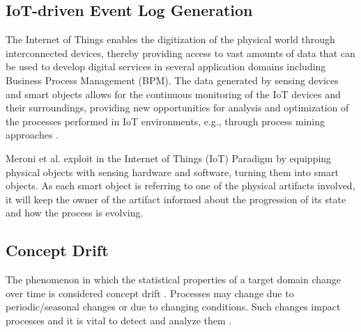 
\begin{multicols}{2}

\subsection{IoT-driven Event Log Generation}
The Internet of Things enables the digitization of the physical world through interconnected devices, thereby providing access to vast amounts of data that can be used to develop digital services in several application domains including Business Process Management (BPM). The data generated by sensing devices and smart objects allows for the continuous monitoring of the IoT devices and their surroundings, providing new opportunities for analysis and optimization of the processes performed in IoT environments, e.g., through process mining approaches \cite{seiger_towards_2020}.

Meroni et al. exploit in \cite{meroni_multi-party_2018} the Internet of Things (IoT) Paradigm by equipping physical objects with sensing hardware and software, turning them into smart objects. %
As each smart object is referring to one of the physical artifacts involved, it will keep the owner of the artifact informed about the progression of its state and how the process is evolving.


\subsection{Concept Drift}
The phenomenon in which the statistical properties of a target domain change over time is considered concept drift \cite{desai_issue_2021}.
Processes may change due to periodic/seasonal changes or due to changing conditions. Such changes impact processes and it is vital to detect and analyze them \cite{van_der_aalst_conformance_2016}.


\end{multicols}
